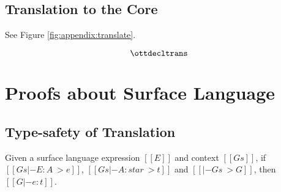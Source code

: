 \subsection{Translation to the Core}
See Figure \ref{fig:appendix:translate}.
\begin{figure*}
\ottdefnctxtrans{}\ottinterrule
\ottdefnpgmtrans{}\ottinterrule
\ottdefndecltrans{}
\[\hlmath{\ottdecltrans}\]\ottinterrule %
\ottdefnpattrans{}\ottinterrule
\ottdefnexprtrans{}
\caption{Translation rules of the surface language}
\label{fig:appendix:translate}
\end{figure*}

\section{Proofs about Surface Language}
\subsection{Type-safety of Translation}

\begin{thm}
Given a surface language expression $[[E]]$ and context $[[Gs]]$, 
if $[[Gs |- E:A ~> e]]$, $[[Gs |- A:star ~> t]]$ and $[[|- Gs ~> G]]$, then
$[[G |- e:t]]$.
\end{thm}

